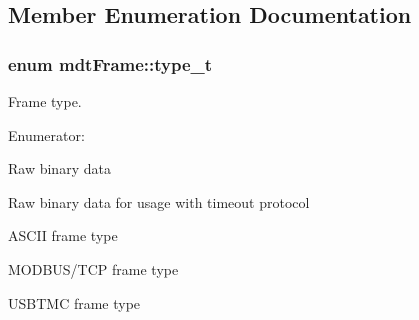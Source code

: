 \subsection{Member Enumeration Documentation}
\hypertarget{classmdt_frame_af936e37d5fe4c066c0fb0161fafd4a17}{
\subsubsection[{type\_\-t}]{\setlength{\rightskip}{0pt plus 5cm}enum {\bf mdtFrame::type\_\-t}}}
\label{classmdt_frame_af936e37d5fe4c066c0fb0161fafd4a17}


Frame type. 

\begin{Desc}
\item[Enumerator: ]\par
\begin{description}
\item[{\em 
\hypertarget{classmdt_frame_af936e37d5fe4c066c0fb0161fafd4a17aeb10e33f775c33799273fcb130fee86f}{
FT\_\-RAW}
\label{classmdt_frame_af936e37d5fe4c066c0fb0161fafd4a17aeb10e33f775c33799273fcb130fee86f}
}]Raw binary data \item[{\em 
\hypertarget{classmdt_frame_af936e37d5fe4c066c0fb0161fafd4a17ac91a1c1827fa634eadaddb861f805c96}{
FT\_\-RAW\_\-TOP}
\label{classmdt_frame_af936e37d5fe4c066c0fb0161fafd4a17ac91a1c1827fa634eadaddb861f805c96}
}]Raw binary data for usage with timeout protocol \item[{\em 
\hypertarget{classmdt_frame_af936e37d5fe4c066c0fb0161fafd4a17ac649559564652abbe656b97d4a84b722}{
FT\_\-ASCII}
\label{classmdt_frame_af936e37d5fe4c066c0fb0161fafd4a17ac649559564652abbe656b97d4a84b722}
}]ASCII frame type \item[{\em 
\hypertarget{classmdt_frame_af936e37d5fe4c066c0fb0161fafd4a17a72c8ddaf29839f4037b686bdc346828a}{
FT\_\-MODBUS\_\-TCP}
\label{classmdt_frame_af936e37d5fe4c066c0fb0161fafd4a17a72c8ddaf29839f4037b686bdc346828a}
}]MODBUS/TCP frame type \item[{\em 
\hypertarget{classmdt_frame_af936e37d5fe4c066c0fb0161fafd4a17aca438ff6b553a819f22090facc562c86}{
FT\_\-USBTMC}
\label{classmdt_frame_af936e37d5fe4c066c0fb0161fafd4a17aca438ff6b553a819f22090facc562c86}
}]USBTMC frame type \end{description}
\end{Desc}



